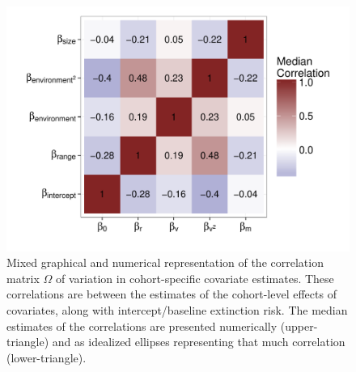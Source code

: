 \documentclass{article}
\begin{document}
\begin{figure}[ht]
  \centering
  \includegraphics[height = 0.8\textheight,width=\textwidth,keepaspectratio=true]{figure/wei_cor_heatmap}
  \caption{Mixed graphical and numerical representation of the correlation matrix \(\Omega\) of variation in cohort-specific covariate estimates. These correlations are between the estimates of the cohort-level effects of covariates, along with intercept/baseline extinction risk. The median estimates of the correlations are presented numerically (upper-triangle) and as idealized ellipses representing that much correlation (lower-triangle).}
  \label{fig:cor_posterior}
\end{figure}


\end{document}
